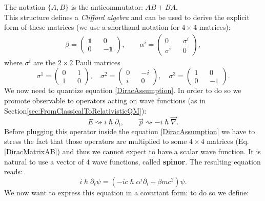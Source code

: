 The notation $\{A,B\}$ is the anticommutator: $AB+BA$.\\
This structure defines a \emph{Clifford algebra} and can be used to derive the explicit form of these matrices (we use a shorthand notation for $4\times4$ matrices):
\begin{align}\label{DiracMatrixAB}
    \beta=\begin{pmatrix}
        \mathds{1}&&0\\
        0&& -\mathds{1}
    \end{pmatrix},\qquad
    \alpha^i=\begin{pmatrix}
        0 && \sigma^i\\
        \sigma^i&& 0
    \end{pmatrix},
\end{align} 
where $\sigma^i$ are the $2\times2$ Pauli matrices
\begin{equation}\label{PauliMatrix}
    \sigma^1=\begin{pmatrix}
        0&&1\\
        1&&0
    \end{pmatrix},\quad
    \sigma^2=\begin{pmatrix}
        0&&-i\\
        i&&0
    \end{pmatrix},\quad
    \sigma^3=\begin{pmatrix}
        1&&0\\
        0&&-1
    \end{pmatrix}.
\end{equation}
We now need to quantize equation \eqref{DiracAssumption}. In order to do so we promote observable to operators acting on wave functions (as in Section\ref{sec:FromClassicalToRelativisticQM}):
\begin{equation*}
    E\rightsquigarrow i\hslash\partial_t,\qquad\vec p\rightsquigarrow -i\hslash\vec\nabla.
\end{equation*} 
Before plugging this operator inside the equation \eqref{DiracAssumption} we have to stress the fact that those operators are multiplied to some $4\times4$ matrices (Eq. \eqref{DiracMatrixAB}) and thus we cannot expect to have a scalar wave function. It is natural to use a vector of $4$ wave functions, called \textbf{spinor}. The resulting equation reads:
\begin{equation*}
    i\hslash\partial_t\psi=(-ic\hslash\alpha^i\partial_i+\beta mc^2)\psi.
\end{equation*}
We now want to express this equation in a covariant form: to do so we define:
